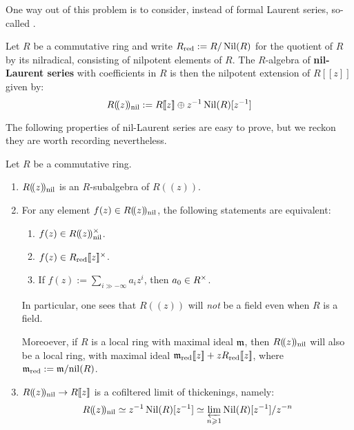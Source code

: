         One way out of this problem is to consider, instead of formal Laurent series, so-called . 
        \begin{definition} \label{def: nil_laurent_series}
            Let $R$ be a commutative ring and write $R_{\mathrm{red}} := R/\operatorname{Nil}(R)$ for the quotient of $R$ by its nilradical, consisting of nilpotent elements of $R$. The $R$-algebra of \textbf{nil-Laurent series} with coefficients in $R$ is then the nilpotent extension of $R[\![z]\!]$ given by:
                $$R(\!(z)\!)_{\mathrm{nil}} := R[\![z]\!] \oplus z^{-1} \operatorname{Nil}(R)[z^{-1}]$$
        \end{definition}
        The following properties of nil-Laurent series are easy to prove, but we reckon they are worth recording nevertheless.
        \begin{lemma}
            Let $R$ be a commutative ring.
            \begin{enumerate}
                \item $R(\!(z)\!)_{\mathrm{nil}}$ is an $R$-subalgebra of $R(\!(z)\!)$. 
                \item For any element $f(z) \in R(\!(z)\!)_{\mathrm{nil}}$, the following statements are equivalent:
                \begin{enumerate}
                    \item $f(z) \in R(\!(z)\!)_{\nil}^{\x}$.
                    \item $f(z) \in R_{\red}[\![z]\!]^{\x}$.
                    \item If $f(z) := \sum_{i \gg -\infty} a_i z^i$, then $a_0 \in R^{\x}$.
                \end{enumerate}
                In particular, one sees that $R(\!(z)\!)$ will \textit{not} be a field even when $R$ is a field.

                Moreoever, if $R$ is a local ring with maximal ideal $\mathfrak{m}$, then $R(\!(z)\!)_{\mathrm{nil}}$ will also be a local ring, with maximal ideal $\mathfrak{m}_{\mathrm{red}}[\![z]\!] + z R_{\mathrm{red}}[\![z]\!]$, where $\mathfrak{m}_{\mathrm{red}} := \mathfrak{m}/\mathrm{nil}(R)$.
                \item $R(\!(z)\!)_{\mathrm{nil}} \to R[\![z]\!]$ is a cofiltered limit of thickenings, namely:
                    $$R(\!(z)\!)_{\mathrm{nil}} \simeq z^{-1} \operatorname{Nil}(R)[z^{-1}] \simeq \varprojlim_{n \geqslant 1} \operatorname{Nil}(R)[z^{-1}]/z^{-n}$$
            \end{enumerate}
        \end{lemma}